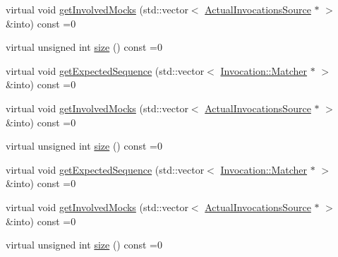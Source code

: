\begin{DoxyCompactItemize}
\item 
virtual void \mbox{\hyperlink{classfakeit_1_1Sequence_a4af96a0de0fa659fe826431e4d61757a}{get\+Involved\+Mocks}} (std\+::vector$<$ \mbox{\hyperlink{structfakeit_1_1ActualInvocationsSource}{Actual\+Invocations\+Source}} $\ast$ $>$ \&into) const =0
\item 
virtual unsigned int \mbox{\hyperlink{classfakeit_1_1Sequence_aa9a45b45fc715148832a9dfb7b555556}{size}} () const =0
\item 
virtual void \mbox{\hyperlink{classfakeit_1_1Sequence_aa1a1e4ad2fcac3379ba38f250bf06884}{get\+Expected\+Sequence}} (std\+::vector$<$ \mbox{\hyperlink{structfakeit_1_1Invocation_1_1Matcher}{Invocation\+::\+Matcher}} $\ast$ $>$ \&into) const =0
\item 
virtual void \mbox{\hyperlink{classfakeit_1_1Sequence_a4af96a0de0fa659fe826431e4d61757a}{get\+Involved\+Mocks}} (std\+::vector$<$ \mbox{\hyperlink{structfakeit_1_1ActualInvocationsSource}{Actual\+Invocations\+Source}} $\ast$ $>$ \&into) const =0
\item 
virtual unsigned int \mbox{\hyperlink{classfakeit_1_1Sequence_aa9a45b45fc715148832a9dfb7b555556}{size}} () const =0
\item 
virtual void \mbox{\hyperlink{classfakeit_1_1Sequence_aa1a1e4ad2fcac3379ba38f250bf06884}{get\+Expected\+Sequence}} (std\+::vector$<$ \mbox{\hyperlink{structfakeit_1_1Invocation_1_1Matcher}{Invocation\+::\+Matcher}} $\ast$ $>$ \&into) const =0
\item 
virtual void \mbox{\hyperlink{classfakeit_1_1Sequence_a4af96a0de0fa659fe826431e4d61757a}{get\+Involved\+Mocks}} (std\+::vector$<$ \mbox{\hyperlink{structfakeit_1_1ActualInvocationsSource}{Actual\+Invocations\+Source}} $\ast$ $>$ \&into) const =0
\item 
virtual unsigned int \mbox{\hyperlink{classfakeit_1_1Sequence_aa9a45b45fc715148832a9dfb7b555556}{size}} () const =0
\end{DoxyCompactItemize}
